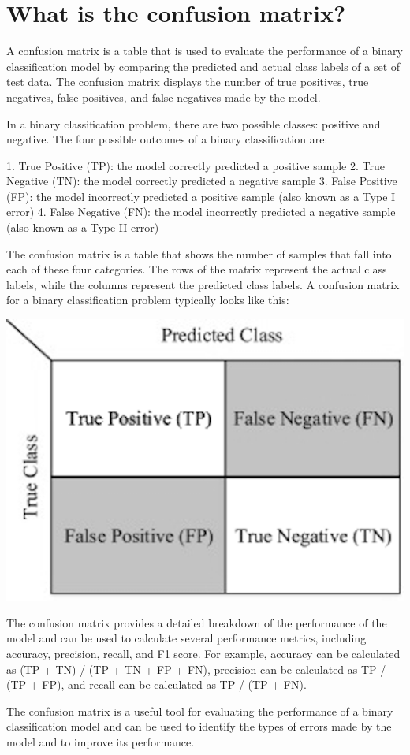 \section{What is the confusion matrix?}
A confusion matrix is a table that is used to evaluate the performance of a binary classification model by comparing the predicted and actual class labels of a set of test data. The confusion matrix displays the number of true positives, true negatives, false positives, and false negatives made by the model.

In a binary classification problem, there are two possible classes: positive and negative. The four possible outcomes of a binary classification are:

1. True Positive (TP): the model correctly predicted a positive sample
2. True Negative (TN): the model correctly predicted a negative sample
3. False Positive (FP): the model incorrectly predicted a positive sample (also known as a Type I error)
4. False Negative (FN): the model incorrectly predicted a negative sample (also known as a Type II error)

The confusion matrix is a table that shows the number of samples that fall into each of these four categories. The rows of the matrix represent the actual class labels, while the columns represent the predicted class labels. A confusion matrix for a binary classification problem typically looks like this:

\includegraphics{./confisionmatrix}

The confusion matrix provides a detailed breakdown of the performance of the model and can be used to calculate several performance metrics, including accuracy, precision, recall, and F1 score. For example, accuracy can be calculated as (TP + TN) / (TP + TN + FP + FN), precision can be calculated as TP / (TP + FP), and recall can be calculated as TP / (TP + FN).

The confusion matrix is a useful tool for evaluating the performance of a binary classification model and can be used to identify the types of errors made by the model and to improve its performance.

